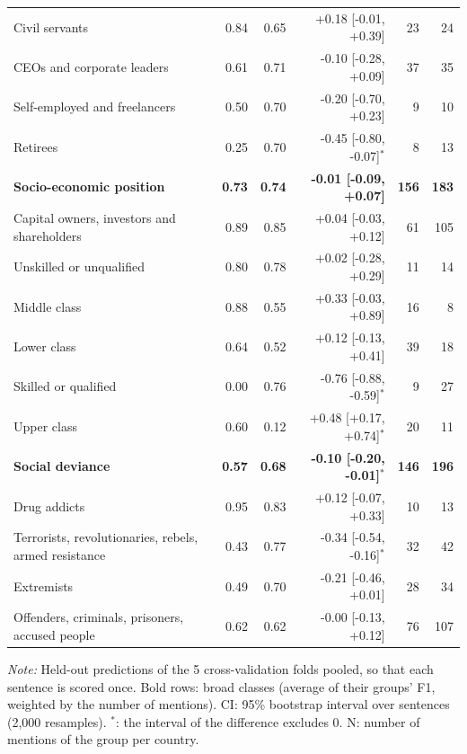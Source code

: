 \begin{table}[htbp]
\begin{threeparttable}
\begin{tabular}{l rr r rr}
\quad Civil servants & 0.84 & 0.65 & +0.18 [-0.01, +0.39] & 23 & 24 \\
\quad CEOs and corporate leaders & 0.61 & 0.71 & -0.10 [-0.28, +0.09] & 37 & 35 \\
\quad Self-employed and freelancers & 0.50 & 0.70 & -0.20 [-0.70, +0.23] & 9 & 10 \\
\quad Retirees & 0.25 & 0.70 & -0.45 [-0.80, -0.07]$^{*}$ & 8 & 13 \\
\addlinespace
\textbf{Socio-economic position} & \textbf{0.73} & \textbf{0.74} & \textbf{-0.01 [-0.09, +0.07]} & \textbf{156} & \textbf{183} \\
\quad Capital owners, investors and shareholders & 0.89 & 0.85 & +0.04 [-0.03, +0.12] & 61 & 105 \\
\quad Unskilled or unqualified & 0.80 & 0.78 & +0.02 [-0.28, +0.29] & 11 & 14 \\
\quad Middle class & 0.88 & 0.55 & +0.33 [-0.03, +0.89] & 16 & 8 \\
\quad Lower class & 0.64 & 0.52 & +0.12 [-0.13, +0.41] & 39 & 18 \\
\quad Skilled or qualified & 0.00 & 0.76 & -0.76 [-0.88, -0.59]$^{*}$ & 9 & 27 \\
\quad Upper class & 0.60 & 0.12 & +0.48 [+0.17, +0.74]$^{*}$ & 20 & 11 \\
\addlinespace
\textbf{Social deviance} & \textbf{0.57} & \textbf{0.68} & \textbf{-0.10 [-0.20, -0.01]$^{*}$} & \textbf{146} & \textbf{196} \\
\quad Drug addicts & 0.95 & 0.83 & +0.12 [-0.07, +0.33] & 10 & 13 \\
\quad Terrorists, revolutionaries, rebels, armed resistance & 0.43 & 0.77 & -0.34 [-0.54, -0.16]$^{*}$ & 32 & 42 \\
\quad Extremists & 0.49 & 0.70 & -0.21 [-0.46, +0.01] & 28 & 34 \\
\quad Offenders, criminals, prisoners, accused people & 0.62 & 0.62 & -0.00 [-0.13, +0.12] & 76 & 107 \\
\bottomrule
\end{tabular}
\begin{tablenotes}[flushleft]
\footnotesize
\item \textit{Note:} Held-out predictions of the 5 cross-validation folds pooled, so that each sentence is scored once. Bold rows: broad classes (average of their groups' F1, weighted by the number of mentions). CI: 95\% bootstrap interval over sentences (2,000 resamples). $^{*}$: the interval of the difference excludes 0. N: number of mentions of the group per country.
\end{tablenotes}
\end{threeparttable}
\end{table}

